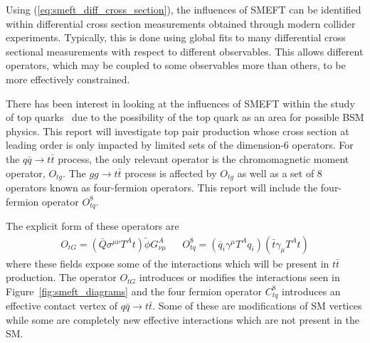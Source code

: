 \documentclass[a4paper,11pt]{article}
\begin{document}
Using (\ref{eq:smeft_diff_cross_section}), the influences of SMEFT can be identified within differential cross section measurements obtained through modern collider experiments.
Typically, this is done using global fits to many differential cross sectional measurements with respect to different observables.
This allows different operators, which may be coupled to some observables more than others, to be more effectively constrained.

There has been interest in looking at the influences of SMEFT within the study of top quarks~\cite{Hartland_2019,Buckley_2015,Brivio_2020} due to the possibility of the top quark as an area for possible BSM physics.
This report will investigate top pair production whose cross section at leading order is only impacted by limited sets of the dimension-6 operators. For the $q\bar{q} \rightarrow t\bar{t}$ process, the only relevant operator is the chromomagnetic moment operator, $O_{tg}$.
The $gg \rightarrow t\bar{t}$ process is affected by $O_{tg}$ as well as a set of 8 operators known as four-fermion operators.
This report will include the four-fermion operator $O_{tq}^{8}$.

The explicit form of these operators are
\begin{align*}
    O_{tG} = (\bar{Q} \sigma^{\mu \nu} T^{A} t) \tilde{\phi} G^{A}_{\nu \mu} && O_{tq}^{8} = (\bar{q}_{i} \gamma^{\mu} T^{A} q_{i})(\bar{t} \gamma_{\mu} T^{A} t)
\end{align*}
where these fields expose some of the interactions which will be present in $t\bar{t}$ production.
The operator $O_{tG}$ introduces or modifies the interactions seen in Figure~\ref{fig:smeft_diagrams} and the four fermion operator $C_{tq}^{8}$ introduces an effective contact vertex of $q\bar{q} \rightarrow t\bar{t}$.
Some of these are modifications of SM vertices while some are completely new effective interactions which are not present in the SM.
\end{document}
